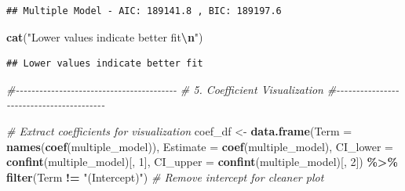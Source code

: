 \documentclass[
  12pt,
]{article}
\newenvironment{Shaded}{\begin{snugshade}}{\end{snugshade}}
\newcommand{\AttributeTok}[1]{\textcolor[rgb]{0.13,0.29,0.53}{#1}}
\newcommand{\CommentTok}[1]{\textcolor[rgb]{0.56,0.35,0.01}{\textit{#1}}}
\newcommand{\DecValTok}[1]{\textcolor[rgb]{0.00,0.00,0.81}{#1}}
\newcommand{\FunctionTok}[1]{\textcolor[rgb]{0.13,0.29,0.53}{\textbf{#1}}}
\newcommand{\NormalTok}[1]{#1}
\newcommand{\OtherTok}[1]{\textcolor[rgb]{0.56,0.35,0.01}{#1}}
\newcommand{\SpecialCharTok}[1]{\textcolor[rgb]{0.81,0.36,0.00}{\textbf{#1}}}
\newcommand{\StringTok}[1]{\textcolor[rgb]{0.31,0.60,0.02}{#1}}
\begin{document}
\begin{verbatim}
## Multiple Model - AIC: 189141.8 , BIC: 189197.6
\end{verbatim}

\begin{Shaded}
\begin{Highlighting}[]
\FunctionTok{cat}\NormalTok{(}\StringTok{"Lower values indicate better fit}\SpecialCharTok{\textbackslash{}n}\StringTok{"}\NormalTok{)}
\end{Highlighting}
\end{Shaded}

\begin{verbatim}
## Lower values indicate better fit
\end{verbatim}

\begin{Shaded}
\begin{Highlighting}[]
\CommentTok{\#{-}{-}{-}{-}{-}{-}{-}{-}{-}{-}{-}{-}{-}{-}{-}{-}{-}{-}{-}{-}{-}{-}{-}{-}{-}{-}{-}{-}{-}{-}{-}{-}{-}{-}{-}{-}{-}{-}{-}{-}{-}}
\CommentTok{\# 5. Coefficient Visualization}
\CommentTok{\#{-}{-}{-}{-}{-}{-}{-}{-}{-}{-}{-}{-}{-}{-}{-}{-}{-}{-}{-}{-}{-}{-}{-}{-}{-}{-}{-}{-}{-}{-}{-}{-}{-}{-}{-}{-}{-}{-}{-}{-}{-}}

\CommentTok{\# Extract coefficients for visualization}
\NormalTok{coef\_df }\OtherTok{\textless{}{-}} \FunctionTok{data.frame}\NormalTok{(}\AttributeTok{Term =} \FunctionTok{names}\NormalTok{(}\FunctionTok{coef}\NormalTok{(multiple\_model)), }\AttributeTok{Estimate =} \FunctionTok{coef}\NormalTok{(multiple\_model),}
    \AttributeTok{CI\_lower =} \FunctionTok{confint}\NormalTok{(multiple\_model)[, }\DecValTok{1}\NormalTok{], }\AttributeTok{CI\_upper =} \FunctionTok{confint}\NormalTok{(multiple\_model)[,}
        \DecValTok{2}\NormalTok{]) }\SpecialCharTok{\%\textgreater{}\%}
    \FunctionTok{filter}\NormalTok{(Term }\SpecialCharTok{!=} \StringTok{"(Intercept)"}\NormalTok{)  }\CommentTok{\# Remove intercept for cleaner plot}


\end{Highlighting}
\end{Shaded}
\end{document}
